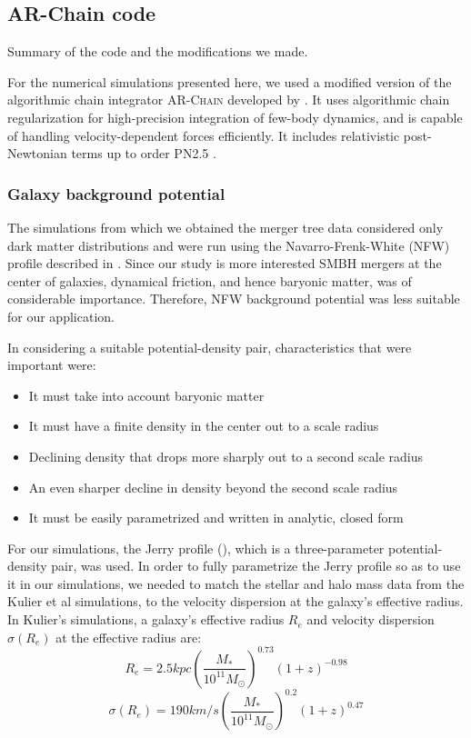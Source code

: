 \documentclass[english, apj]{emulateapj}
\begin{document}
\subsection{AR-Chain code}
Summary of the code and the modifications we made.

For the numerical simulations presented here, we used a modified version of the algorithmic chain integrator \textsc{AR-Chain} developed by \citet{2006MNRAS.372..219M}. It uses algorithmic chain regularization for high-precision integration of few-body dynamics, and is capable of handling velocity-dependent forces efficiently. It includes relativistic post-Newtonian terms up to order PN2.5 \citep{2008AJ....135.2398M}.


\subsubsection{Galaxy background potential}
The simulations from which we obtained the merger tree data considered only dark matter distributions and were run using the Navarro-Frenk-White (NFW) profile described in \citet{1997ApJ...490..493N}.  Since our study is more interested SMBH mergers at the center of galaxies, dynamical friction, and hence baryonic matter, was of considerable importance.  Therefore, NFW background potential was less suitable for our application.

In considering a suitable potential-density pair, characteristics that were important were:
\begin{itemize}
\item It must take into account baryonic matter
\item It must have a finite density in the center out to a scale radius
\item Declining density that drops more sharply out to a second scale radius
\item An even sharper decline in density beyond the second scale radius
\item It must be easily parametrized and written in analytic, closed form
\end{itemize}

For our simulations, the Jerry profile (\citet{2015ApJ...806L..28S}), which is a three-parameter potential-density pair, was used.  In order to fully parametrize the Jerry profile so as to use it in our simulations, we needed to match the stellar and halo mass data from the Kulier et al simulations, to the velocity dispersion at the galaxy's effective radius.  In Kulier's simulations, a galaxy's effective radius $R_{e}$ and velocity dispersion $\sigma(R_e)$ at the effective radius are:
\begin{equation} \label{re}
R_{e} = 2.5 kpc\left(\frac{M_*}{10^{11}M_{\odot}}\right)^{0.73}(1+z)^{-0.98}
\end{equation}
\begin{equation} \label{sig}
\sigma(R_{e}) = 190km/s\left(\frac{M_{*}}{10^{11}M_{\odot}}\right)^{0.2}(1+z)^{0.47}
\end{equation}
\end{document}
